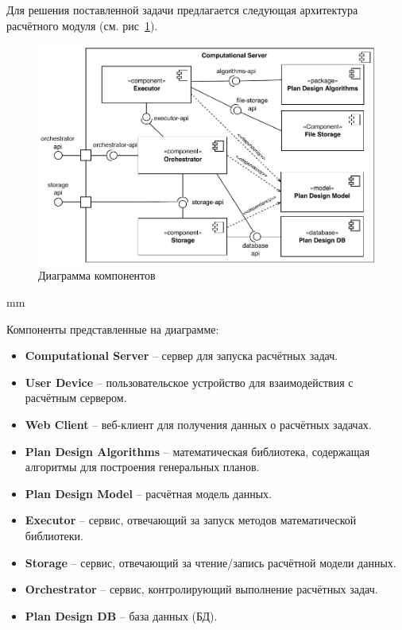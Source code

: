 Для решения поставленной задачи предлагается следующая архитектура расчётного модуля
(см. рис\ \ref{pic:architecture__common-component}).

\begin{figure}[H]
	\hspace*{-2.5 cm}\includegraphics[width=\textwidth, left]{architecture/pictures/common/component}
	\caption{Диаграмма компонентов}
	\label{pic:architecture__common-component}
\end{figure}
 mm

\noindent Компоненты представленные на диаграмме:
\begin{itemize}
	\item \textbf{Computational Server} -- сервер для запуска расчётных задач.
	\item \textbf{User Device} -- пользовательское устройство для взаимодействия с расчётным сервером.
	\item \textbf{Web Client} -- веб-клиент для получения данных о расчётных задачах.
	\item \textbf{Plan Design Algorithms} -- математическая библиотека, содержащая алгоритмы
	для построения генеральных планов.
	\item \textbf{Plan Design Model} -- расчётная модель данных.
	\item \textbf{Executor} -- сервис, отвечающий за запуск методов математической библиотеки.
	\item \textbf{Storage} -- сервис, отвечающий за чтение/запись расчётной модели данных.
	\item \textbf{Orchestrator} -- сервис, контролирующий выполнение расчётных задач.
	\item \textbf{Plan Design DB} -- база данных (БД).
\end{itemize}

